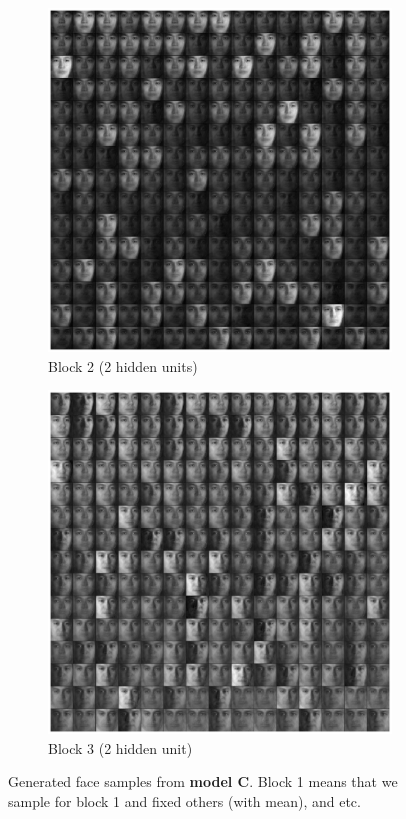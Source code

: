 \begin{figure}
\begin{subfigure}[b]{0.5\textwidth}
    \includegraphics[width=\textwidth]{images/faceNWblock2.eps}
    \vspace{-2\baselineskip}
    \caption{Block 2 (2 hidden units)}
    \end{subfigure}
    \begin{subfigure}[b]{0.5\textwidth}
    \includegraphics[width=\textwidth]{images/faceNWblock3.eps}
    \vspace{-2\baselineskip}
    \caption{Block 3 (2 hidden unit)}
    \end{subfigure}
    \caption{Generated face samples from \textbf{model C}. Block 1 means that we sample for block 1 and fixed others (with mean), and etc.}\label{fig:animals}
    \label{fig:FacesamplesModel3}
\end{figure}



